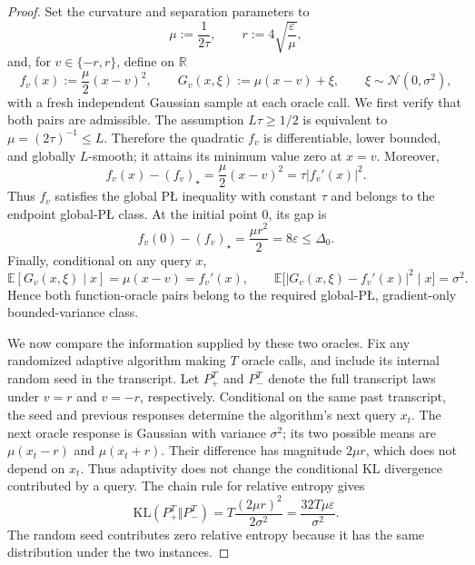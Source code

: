 \documentclass[11pt]{article}
\newcommand{\R}{\mathbb{R}}
\newcommand{\E}{\mathbb{E}}
\newcommand{\abs}[1]{\left\lvert #1\right\rvert}
\begin{document}
\begin{proof}
Set the curvature and separation parameters to
\[
\mu:=\frac1{2\tau},
\qquad
r:=4\sqrt{\frac{\varepsilon}{\mu}},
\]
and, for $v\in\{-r,r\}$, define on $\R$
\begin{equation}
\label{eq:endpoint-two-point-pair}
f_v(x):=\frac{\mu}{2}(x-v)^2,
\qquad
G_v(x,\xi):=\mu(x-v)+\xi,
\qquad
\xi\sim\mathcal N(0,\sigma^2),
\end{equation}
with a fresh independent Gaussian sample at each oracle call. We first verify that both pairs are admissible. The
assumption $L\tau\ge1/2$ is equivalent to $\mu=(2\tau)^{-1}\le L$. Therefore the quadratic $f_v$ is differentiable,
lower bounded, and globally $L$-smooth; it attains its minimum value zero at $x=v$. Moreover,
\[
f_v(x)-(f_v)_\star
=
\frac{\mu}{2}(x-v)^2
=
\tau\abs{f_v'(x)}^2.
\]
Thus $f_v$ satisfies the global P\L{} inequality with constant $\tau$ and belongs to the endpoint
global-P\L{} class. At the
initial point $0$, its gap is
\[
f_v(0)-(f_v)_\star=\frac{\mu r^2}{2}=8\varepsilon\le\Delta_0.
\]
Finally, conditional on any query $x$,
\[
\E[G_v(x,\xi)\mid x]=\mu(x-v)=f_v'(x),
\qquad
\E\bigl[\abs{G_v(x,\xi)-f_v'(x)}^2\mid x\bigr]=\sigma^2.
\]
Hence both function-oracle pairs belong to the required global-P\L{}, gradient-only bounded-variance
class.

We now compare the information supplied by these two oracles. Fix any randomized adaptive algorithm making $T$
oracle calls, and include its internal random seed in the transcript. Let $P_+^T$ and $P_-^T$ denote the full
transcript laws under $v=r$ and $v=-r$, respectively. Conditional on the same past transcript, the seed and previous
responses determine the algorithm's next query $x_t$. The next oracle response is Gaussian with variance $\sigma^2$;
its two possible means are $\mu(x_t-r)$ and $\mu(x_t+r)$. Their difference has magnitude $2\mu r$, which does not
depend on $x_t$. Thus adaptivity does not change the conditional KL divergence contributed by a query. The chain rule
for relative entropy gives
\begin{equation}
\label{eq:endpoint-transcript-kl}
\mathrm{KL}(P_+^T\Vert P_-^T)
=
T\frac{(2\mu r)^2}{2\sigma^2}
=
\frac{32T\mu\varepsilon}{\sigma^2}.
\end{equation}
The random seed contributes zero relative entropy because it has the same distribution under the two instances.


\end{proof}
\end{document}
